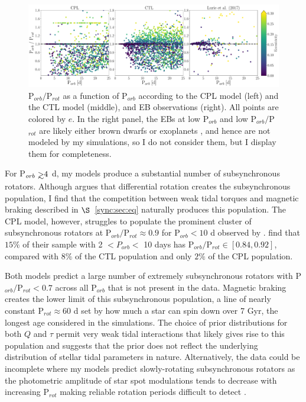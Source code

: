 \begin{figure}
	\includegraphics[width=\columnwidth]{lurieFig7.pdf}
   \caption{P$_{orb}/$P$_{rot}$ as a function of P$_{orb}$ according to the CPL model (left) and the CTL model (middle), and \citet{Lurie2017} \kepler EB observations (right). All points are colored by $e$.  In the right panel, the \kepler EBs at low P$_{orb}$ and low P$_{orb}/$P$_{rot}$ are likely either brown dwarfs or exoplanets \citep{Lurie2017}, and hence are not modeled by my simulations, so I do not consider them, but I display them for completeness.}%
    \label{sync:fig:lurie7}%
\end{figure}

For P$_{orb} \gsim 4$ d, my models produce a substantial number of subsynchronous rotators. Although \citet{Lurie2017} argues that differential rotation creates the subsynchronous population, I find that the competition between weak tidal torques and magnetic braking described in $\S$~\ref{sync:sec:eq} naturally produces this population. The CPL model, however, struggles to populate the prominent cluster of subsynchronous rotators at P$_{orb}/$P$_{rot} \approx 0.9$ for P$_{orb} < 10$ d observed by \citet{Lurie2017}.  \citet{Lurie2017} find that $15\%$ of their sample with 2 $< P_{orb} <$ 10 days has P$_{orb}/$P$_{rot} \in [0.84, 0.92]$, compared with $8\%$ of the CTL population and only $2\%$ of the CPL population.

Both models predict a large number of extremely subsynchronous rotators with P$_{orb}/$P$_{rot} < 0.7$ across all P$_{orb}$ that is not present in the \citet{Lurie2017} data. Magnetic braking creates the lower limit of this subsynchronous population, a line of nearly constant P$_{rot} \approx 60$ d set by how much a star can spin down over 7 Gyr, the longest age considered in the simulations. The choice of prior distributions for both $Q$ and $\tau$ permit very weak tidal interactions that likely gives rise to this population and suggests that the prior does not reflect the underlying distribution of stellar tidal parameters in nature. Alternatively, the data could be incomplete where my models predict slowly-rotating subsynchronous rotators as the photometric amplitude of star spot modulations tends to decrease with increasing P$_{rot}$ making reliable rotation periods difficult to detect \citep{McQuillan2014,Lurie2017,Reinhold2018}. 

